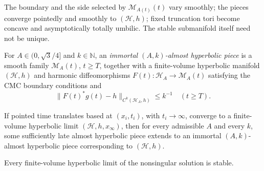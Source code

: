\begin{remark}
\label{rem:chow-iv-stable-hyperbolic-limit-properties}
The boundary and the side selected by \(\mathcal M_{A(t)}(t)\) vary smoothly;
the pieces converge pointedly and smoothly to \((\mathcal H,h)\); fixed
truncation tori become concave and asymptotically totally umbilic.  The stable
submanifold itself need not be unique.
\end{remark}

\begin{definition}
\label{def:chow-iv-immortal-almost-hyperbolic-piece}
For \(A\in(0,\sqrt3/4]\) and \(k\in\mathbb N\), an \emph{immortal
\((A,k)\)-almost hyperbolic piece} is a smooth family
\(\mathcal M_A(t)\), \(t\ge T\), together with a finite-volume hyperbolic
manifold \((\mathcal H,h)\) and harmonic diffeomorphisms
\(F(t):\mathcal H_A\to\mathcal M_A(t)\) satisfying the CMC boundary conditions
and
\[
 \|F(t)^*g(t)-h\|_{C^k(\mathcal H_A,h)}\le k^{-1}
 \quad(t\ge T).
\]
\end{definition}

\begin{proposition}
\label{prop:chow-iv-almost-hyperbolic-pieces-immortal}
If pointed time translates based at \((x_i,t_i)\), with \(t_i\to\infty\),
converge to a finite-volume hyperbolic limit \((\mathcal H,h,x_\infty)\), then
for every admissible \(A\) and every \(k\), some sufficiently late almost
hyperbolic piece extends to an immortal \((A,k)\)-almost hyperbolic piece
corresponding to \((\mathcal H,h)\).
\end{proposition}

\begin{proposition}
\label{prop:chow-iv-stability-hyperbolic-limits}
Every finite-volume hyperbolic limit of the nonsingular solution is stable.
\end{proposition}


